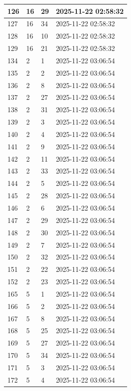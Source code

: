 \begin{longtable}{|l|l|l|l|}
126 & 16 & 29 & 2025-11-22 02:58:32 \\ \hline 
127 & 16 & 34 & 2025-11-22 02:58:32 \\ \hline 
128 & 16 & 10 & 2025-11-22 02:58:32 \\ \hline 
129 & 16 & 21 & 2025-11-22 02:58:32 \\ \hline 
134 & 2 & 1 & 2025-11-22 03:06:54 \\ \hline 
135 & 2 & 2 & 2025-11-22 03:06:54 \\ \hline 
136 & 2 & 8 & 2025-11-22 03:06:54 \\ \hline 
137 & 2 & 27 & 2025-11-22 03:06:54 \\ \hline 
138 & 2 & 31 & 2025-11-22 03:06:54 \\ \hline 
139 & 2 & 3 & 2025-11-22 03:06:54 \\ \hline 
140 & 2 & 4 & 2025-11-22 03:06:54 \\ \hline 
141 & 2 & 9 & 2025-11-22 03:06:54 \\ \hline 
142 & 2 & 11 & 2025-11-22 03:06:54 \\ \hline 
143 & 2 & 33 & 2025-11-22 03:06:54 \\ \hline 
144 & 2 & 5 & 2025-11-22 03:06:54 \\ \hline 
145 & 2 & 28 & 2025-11-22 03:06:54 \\ \hline 
146 & 2 & 6 & 2025-11-22 03:06:54 \\ \hline 
147 & 2 & 29 & 2025-11-22 03:06:54 \\ \hline 
148 & 2 & 30 & 2025-11-22 03:06:54 \\ \hline 
149 & 2 & 7 & 2025-11-22 03:06:54 \\ \hline 
150 & 2 & 32 & 2025-11-22 03:06:54 \\ \hline 
151 & 2 & 22 & 2025-11-22 03:06:54 \\ \hline 
152 & 2 & 23 & 2025-11-22 03:06:54 \\ \hline 
165 & 5 & 1 & 2025-11-22 03:06:54 \\ \hline 
166 & 5 & 2 & 2025-11-22 03:06:54 \\ \hline 
167 & 5 & 8 & 2025-11-22 03:06:54 \\ \hline 
168 & 5 & 25 & 2025-11-22 03:06:54 \\ \hline 
169 & 5 & 27 & 2025-11-22 03:06:54 \\ \hline 
170 & 5 & 34 & 2025-11-22 03:06:54 \\ \hline 
171 & 5 & 3 & 2025-11-22 03:06:54 \\ \hline 
172 & 5 & 4 & 2025-11-22 03:06:54 \\ \hline 

\end{longtable}
